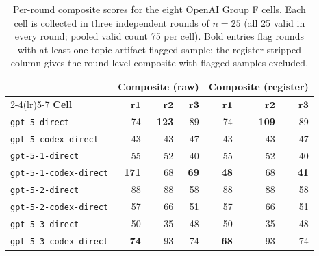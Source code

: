 \documentclass[11pt,a4paper]{article}
\begin{document}
\begin{table}[h]
\centering
\caption{Per-round composite scores for the eight OpenAI Group F cells. Each cell is collected in three independent rounds of $n{=}25$ (all 25 valid in every round; pooled valid count 75 per cell). Bold entries flag rounds with at least one topic-artifact-flagged sample; the register-stripped column gives the round-level composite with flagged samples excluded.}
\label{tab:per-round}
\small
\begin{tabular}{lrrr@{\hspace{1.2em}}rrr}
\toprule
& \multicolumn{3}{c}{\textbf{Composite (raw)}} & \multicolumn{3}{c}{\textbf{Composite (register)}} \\
\cmidrule(lr){2-4}\cmidrule(lr){5-7}
\textbf{Cell} & $\boldsymbol{r1}$ & $\boldsymbol{r2}$ & $\boldsymbol{r3}$ & $\boldsymbol{r1}$ & $\boldsymbol{r2}$ & $\boldsymbol{r3}$ \\
\midrule
\texttt{gpt-5-direct}          & 74  & \textbf{123} & 89 & 74 & \textbf{109} & 89 \\
\texttt{gpt-5-codex-direct}    & 43  & 43  & 47 & 43 & 43 & 47 \\
\texttt{gpt-5-1-direct}        & 55  & 52  & 40 & 55 & 52 & 40 \\
\texttt{gpt-5-1-codex-direct}  & \textbf{171} & 68 & \textbf{69} & \textbf{48} & 68 & \textbf{41} \\
\texttt{gpt-5-2-direct}        & 88  & 88  & 58 & 88 & 88 & 58 \\
\texttt{gpt-5-2-codex-direct}  & 57  & 66  & 51 & 57 & 66 & 51 \\
\texttt{gpt-5-3-direct}        & 50  & 35  & 48 & 50 & 35 & 48 \\
\texttt{gpt-5-3-codex-direct}  & \textbf{74}  & 93  & 74 & \textbf{68} & 93 & 74 \\
\bottomrule
\end{tabular}
\end{table}
\end{document}
